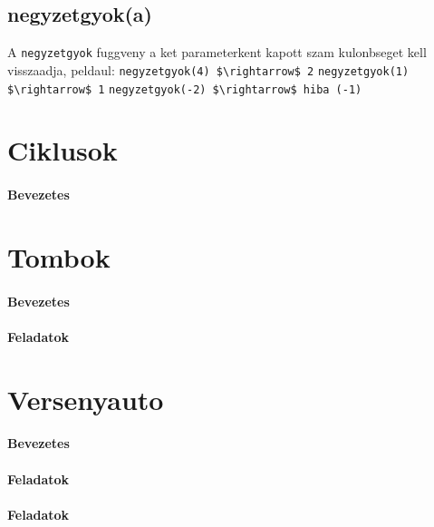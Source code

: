 \documentclass{article}
\begin{document}
    \subsection{negyzetgyok(a)}
    A \lstinline{negyzetgyok} fuggveny a ket parameterkent kapott szam kulonbseget kell visszaadja,
peldaul:\newline
\lstinline[mathescape]{negyzetgyok(4) $\rightarrow$ 2}\newline
\lstinline[mathescape]{negyzetgyok(1) $\rightarrow$ 1}\newline
\lstinline[mathescape]{negyzetgyok(-2) $\rightarrow$ hiba (-1)}\newline

    \section{Ciklusok}

    \paragraph{Bevezetes}



    \section{Tombok}

    \paragraph{Bevezetes}

    \paragraph{Feladatok}


    \section{Versenyauto}

    \paragraph{Bevezetes}

    \paragraph{Feladatok}

    \paragraph{Feladatok}
\end{document}
